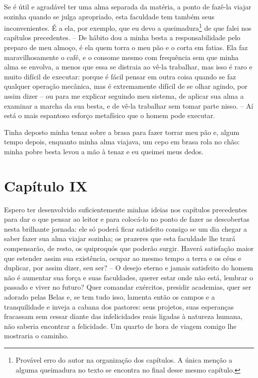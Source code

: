  Se é útil e agradável ter uma alma separada da matéria, a ponto de
fazê-la viajar sozinha quando se julga apropriado, esta faculdade tem
também seus inconvenientes. É a ela, por exemplo, que eu devo a
queimadura\footnote{Provável erro do autor na organização dos capítulos. A única menção a alguma queimadura no texto se encontra no final desse mesmo capítulo.}  
de que falei nos capítulos precedentes. -- De hábito dou a                         
minha besta a responsabilidade pelo preparo de meu almoço, é ela quem												
torra o meu pão e o corta em fatias. Ela faz maravilhosamente o café, e
o consome mesmo com frequência sem que minha alma se envolva, a menos
que essa se distraia ao vê-la trabalhar, mas isso é raro e muito
difícil de executar: porque é fácil pensar em outra coisa quando se faz
qualquer operação mecânica, mas é extremamente difícil de se olhar
agindo, por assim dizer -- ou para me explicar seguindo meu sistema,
de aplicar sua alma a examinar a marcha da sua besta, e de vê-la
trabalhar sem tomar parte nisso. -- Aí está o mais espantoso esforço
metafísico que o homem pode executar.

 Tinha deposto minha tenaz sobre a brasa para fazer torrar meu pão e,
algum tempo depois, enquanto minha alma viajava, um cepo em brasa rola
no chão: minha pobre besta levou a mão à tenaz e eu queimei meus dedos.

\section{Capítulo IX}

 Espero ter desenvolvido suficientemente minhas ideias nos capítulos
precedentes para dar o que pensar ao leitor e para colocá-lo no ponto
de fazer as descobertas nesta brilhante jornada: ele só poderá ficar
satisfeito consigo se um dia chegar a saber fazer sua alma viajar
sozinha; os prazeres que esta faculdade lhe trará compensarão, de
resto, os quiproquós que poderão surgir. Haverá satisfação maior que
estender assim sua existência, ocupar ao mesmo tempo a terra e os céus
e duplicar, por assim dizer, seu ser? -- O desejo eterno e jamais
satisfeito do homem não é aumentar sua força e suas faculdades, querer
estar onde não está, lembrar o passado e viver no futuro? Quer comandar
exércitos, presidir academias, quer ser adorado pelas Belas e, se tem
tudo isso, lamenta então os campos e a tranquilidade e inveja a cabana
dos pastores: seus projetos, suas esperanças fracassam sem cessar
diante das infelicidades reais ligadas à natureza humana, não saberia
encontrar a felicidade. Um quarto de hora de viagem comigo lhe
mostraria o caminho.

